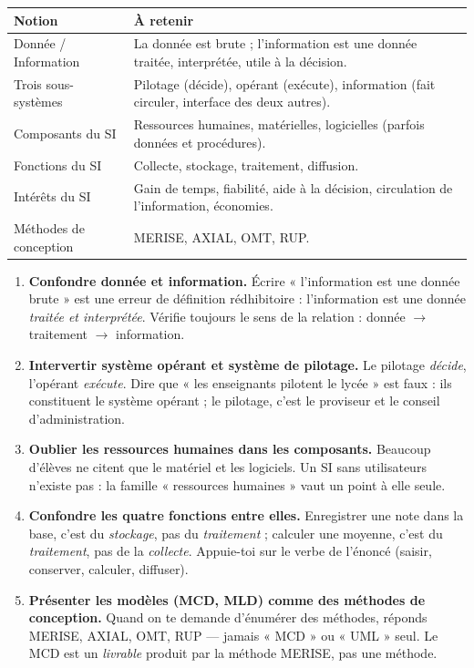 \documentclass[11pt]{article}
\begin{document}
\begin{aretenir}
\begin{center}
\begin{tabularx}{\linewidth}{|l|X|}
\hline
\rowcolor{popblueL} \textbf{Notion} & \textbf{À retenir} \\
\hline
Donnée / Information & La donnée est brute ; l'information est une donnée traitée, interprétée, utile à la décision. \\
\hline
Trois sous-systèmes & Pilotage (décide), opérant (exécute), information (fait circuler, interface des deux autres). \\
\hline
Composants du SI & Ressources humaines, matérielles, logicielles (parfois données et procédures). \\
\hline
Fonctions du SI & Collecte, stockage, traitement, diffusion. \\
\hline
Intérêts du SI & Gain de temps, fiabilité, aide à la décision, circulation de l'information, économies. \\
\hline
Méthodes de conception & MERISE, AXIAL, OMT, RUP. \\
\hline
\end{tabularx}
\end{center}
\end{aretenir}

\begin{attention}
\begin{enumerate}
\item \textbf{Confondre donnée et information.} Écrire « l'information est une donnée brute » est une erreur de définition rédhibitoire : l'information est une donnée \emph{traitée et interprétée}. Vérifie toujours le sens de la relation : donnée $\to$ traitement $\to$ information.
\item \textbf{Intervertir système opérant et système de pilotage.} Le pilotage \emph{décide}, l'opérant \emph{exécute}. Dire que « les enseignants pilotent le lycée » est faux : ils constituent le système opérant ; le pilotage, c'est le proviseur et le conseil d'administration.
\item \textbf{Oublier les ressources humaines dans les composants.} Beaucoup d'élèves ne citent que le matériel et les logiciels. Un SI sans utilisateurs n'existe pas : la famille « ressources humaines » vaut un point à elle seule.
\item \textbf{Confondre les quatre fonctions entre elles.} Enregistrer une note dans la base, c'est du \emph{stockage}, pas du \emph{traitement} ; calculer une moyenne, c'est du \emph{traitement}, pas de la \emph{collecte}. Appuie-toi sur le verbe de l'énoncé (saisir, conserver, calculer, diffuser).
\item \textbf{Présenter les modèles (MCD, MLD) comme des méthodes de conception.} Quand on te demande d'énumérer des méthodes, réponds MERISE, AXIAL, OMT, RUP — jamais « MCD » ou « UML » seul. Le MCD est un \emph{livrable} produit par la méthode MERISE, pas une méthode.
\end{enumerate}
\end{attention}
\end{document}
